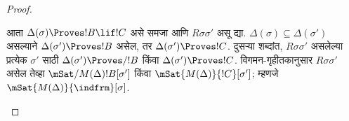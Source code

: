 \documentclass[../../../include/open-logic-section]{subfiles}
\begin{document}
\begin{proof}
\begin{enumerate}
{        आता $\Delta(\sigma) \Proves !B \lif !C$
        असे समजा आणि $R\sigma\sigma'$ असू द्या.
        $\Delta(\sigma) \subseteq
        \Delta(\sigma')$ असल्याने
        $\Delta(\sigma') \Proves
        !B$ असेल, तर
        $\Delta(\sigma') \Proves !C$.
        दुसऱ्या शब्दांत, $R\sigma\sigma'$
        असलेल्या प्रत्येक $\sigma'$ साठी
        $\Delta(\sigma') \Proves/ !B$
        किंवा $\Delta(\sigma') \Proves
        !C$. विगमन-गृहीतकानुसार
        $R\sigma\sigma'$ असेल तेव्हा
        $\mSat/{M(\Delta)}{!B}[\sigma']$
        किंवा $\mSat{M(\Delta)}{!C}[\sigma']$;
        म्हणजे
        $\mSat{M(\Delta)}{\indfrm}[\sigma]$.}
  \end{enumerate}
\end{proof}
\end{document}

